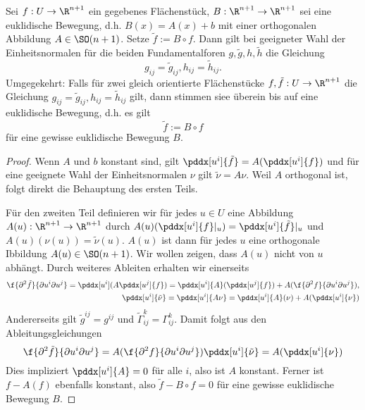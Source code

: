 \begin{lem}
	Sei $f: U \to \R^{n+1}$ ein gegebenes Flächenstück, $B: \R^{n+1} \to \R^{n+1}$ sei eine euklidische Bewegung, d.h. $B(x) = A(x) + b$ mit einer orthogonalen Abbildung $A \in \SO(n+1)$.
	Setze $\tilde f := B \circ f$.
	Dann gilt bei geeigneter Wahl der Einheitsnormalen für die beiden Fundamentalforen $g, \tilde g, h, \tilde h$ die Gleichung
	\[
		g_{ij} = \tilde g_{ij},
		h_{ij} = \tilde h_{ij}.
	\]
	Umgegekehrt: Falls für zwei gleich orientierte Flächenstücke $f, \tilde f: U \to \R^{n+1}$ die Gleichung $g_{ij} = \tilde g_{ij}, h_{ij} = \tilde h_{ij}$ gilt, dann stimmen siee überein bis auf eine euklidische Bewegung, d.h. es gilt
	\[
		\tilde f := B \circ f
	\]
	für eine gewisse euklidische Bewegung $B$.
	\begin{proof}
		Wenn $A$ und $b$ konstant sind, gilt $\pddx[u^i]{\tilde f} = A(\pddx[u^i]{f})$ und für eine geeignete Wahl der Einheitsnormalen $\nu$ gilt $\tilde \nu = A\nu$.
		Weil $A$ orthogonal ist, folgt direkt die Behauptung des ersten Teils.

		Für den zweiten Teil definieren wir für jedes $u \in U$ eine Abbildung $A(u): \R^{n+1} \to \R^{n+1}$ durch $A(u)(\pddx[u^i]{f}|_u) = \pddx[u^i]{\tilde f}|_u$ und $A(u)(\nu(u)) = \tilde \nu(u)$.
		$A(u)$ ist dann für jedes $u$ eine orthogonale Ibbildung $A(u) \in \SO(n+1)$.
		Wir wollen zeigen, dass $A(u)$ nicht von $u$ abhängt.
		Durch weiteres Ableiten erhalten wir einerseits
		\begin{align*}
			\f{\partial^2 \tilde f}{\partial u^i \partial u^j}
			= \pddx[u^i] (A \pddx[u^j]{f})
			= \pddx[u^i]{A} (\pddx[u^j]{f}) + A(\f{\partial^2 f}{\partial u^i \partial u^j}), \\
			\pddx[u^i]{\tilde \nu} = \pddx[u^i]{A\nu} = \pddx[u^i]{A}(\nu) + A (\pddx[u^i]{\nu})
		\end{align*}
		Andererseits gilt $\tilde g^{ij} = g^{ij}$ und $\tilde \Gamma_{ij}^k = \Gamma_{ij}^k$.
		Damit folgt aus den Ableitungsgleichungen
		\[
			\f{\partial^2 \tilde f}{\partial u^i \partial u^j}
			= A (\f{\partial^2 f}{\partial u^i \partial u^j})
			\pddx[u^i]{\tilde \nu} = A (\pddx[u^i]{\nu})
		\]
		Dies impliziert $\pddx[u^i]{A} = 0$ für alle $i$, also ist $A$ konstant.
		Ferner ist $f - A(f)$ ebenfalls konstant, also $\tilde f - B\circ f = 0$ für eine gewisse euklidische Bewegung $B$.
	\end{proof}
\end{lem}




